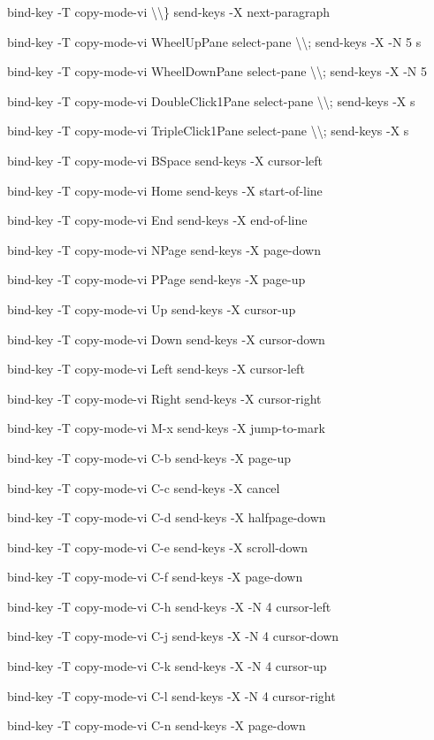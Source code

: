 \documentclass[11pt,a4paper,twoside]{book}
\begin{document}
bind-key  -T copy-mode-vi \textbackslash{}\textbackslash{}\}  send-keys -X next-paragraph

bind-key  -T copy-mode-vi WheelUpPane  select-pane \textbackslash{}\textbackslash{}; send-keys -X -N 5 s

bind-key  -T copy-mode-vi WheelDownPane  select-pane \textbackslash{}\textbackslash{}; send-keys -X -N 5

bind-key  -T copy-mode-vi DoubleClick1Pane  select-pane \textbackslash{}\textbackslash{}; send-keys -X s

bind-key  -T copy-mode-vi TripleClick1Pane  select-pane \textbackslash{}\textbackslash{}; send-keys -X s

bind-key  -T copy-mode-vi BSpace  send-keys -X cursor-left

bind-key  -T copy-mode-vi Home  send-keys -X start-of-line

bind-key  -T copy-mode-vi End  send-keys -X end-of-line

bind-key  -T copy-mode-vi NPage  send-keys -X page-down

bind-key  -T copy-mode-vi PPage  send-keys -X page-up

bind-key  -T copy-mode-vi Up  send-keys -X cursor-up

bind-key  -T copy-mode-vi Down  send-keys -X cursor-down

bind-key  -T copy-mode-vi Left  send-keys -X cursor-left

bind-key  -T copy-mode-vi Right  send-keys -X cursor-right

bind-key  -T copy-mode-vi M-x  send-keys -X jump-to-mark

bind-key  -T copy-mode-vi C-b  send-keys -X page-up

bind-key  -T copy-mode-vi C-c  send-keys -X cancel

bind-key  -T copy-mode-vi C-d  send-keys -X halfpage-down

bind-key  -T copy-mode-vi C-e  send-keys -X scroll-down

bind-key  -T copy-mode-vi C-f  send-keys -X page-down

bind-key  -T copy-mode-vi C-h  send-keys -X -N 4 cursor-left

bind-key  -T copy-mode-vi C-j  send-keys -X -N 4 cursor-down

bind-key  -T copy-mode-vi C-k  send-keys -X -N 4 cursor-up

bind-key  -T copy-mode-vi C-l  send-keys -X -N 4 cursor-right

bind-key  -T copy-mode-vi C-n  send-keys -X page-down
\end{document}

